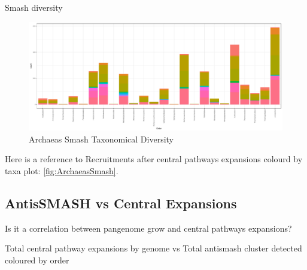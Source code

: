 \documentclass[12pt,twoside]{reedthesis}
\begin{document}
  Smash diversity
  
  \begin{figure}[h!tbp]
  \centering
  \includegraphics[angle = 0,scale = 0.5]{chapter2/Archaeas/ArchaeasSmash.pdf}
  \caption[Archaeas Smash Taxonomical Diversity]{\normalsize{Archaeas Smash Taxonomical Diversity}}
  \label{fig:ArchaeasSmash}
  \end{figure}
  
  Here is a reference to Recruitments after central pathways expansions
  colourd by taxa plot: \autoref{fig:ArchaeasSmash}. \clearpage
  
  \subsection{AntisSMASH vs Central
  Expansions}\label{antissmash-vs-central-expansions}
  
  Is it a correlation between pangenome grow and central pathways
  expansions?
  
  Total central pathway expansions by genome vs Total antismash cluster
  detected coloured by order
  
\end{document}
